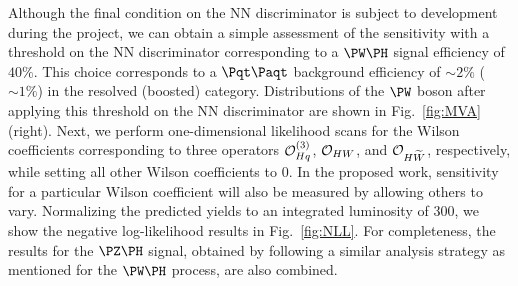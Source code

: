 \documentclass[a4paper,11pt]{article}
\newcommand{\Pt}{{{\Pqt}}\xspace}
\newcommand{\PAt}{{{{\Paqt}}}\xspace}
\begin{document}
Although the final condition on the NN discriminator is subject to development during the project, 
we can obtain a simple assessment of the sensitivity with a threshold on the NN discriminator corresponding to a $\PW\PH$ signal efficiency of $40\%$.
This choice corresponds to a $\Pt\PAt$ background efficiency of $\sim 2\%$ ($\sim 1\%$) in the resolved (boosted) category.
Distributions of the $\PW$ boson \pt after applying this threshold on the NN discriminator are shown in Fig.~\ref{fig:MVA} (right). 
Next, we perform one-dimensional likelihood scans for the Wilson coefficients corresponding to three operators ${\cal O}^{(3)}_{Hq}$, ${\cal O}_{HW}$, and ${\cal O}_{H\widetilde{W}}$, respectively, while setting all other Wilson coefficients to $0$. 
In the proposed work, sensitivity for a particular Wilson coefficient will also be measured by allowing others to vary.
Normalizing the predicted yields to an integrated luminosity of 300\fbinv, we show the negative log-likelihood results in Fig.~\ref{fig:NLL}. %
For completeness, the results for the $\PZ\PH$ signal, obtained by following a similar analysis strategy as mentioned for the $\PW\PH$ process, are also combined. 
\end{document}
